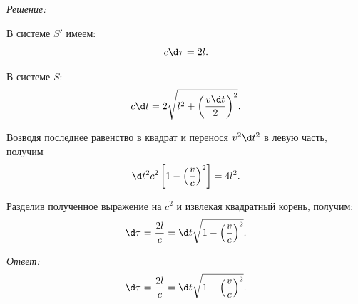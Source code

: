 \vspace*{2em}
\emph{Решение:}
    
    В системе \( S' \) имеем:
    \[
        c\d\tau = 2l.
    \]
    
    В системе \( S \):
    \[
        c\d t = 2\sqrt{l^2 + \left(\frac{v\d t}{2}\right)^2}.
    \]
    
    Возводя последнее равенство в квадрат и перенося \( v^2\d t^2 \) в левую часть,
    получим
    \[
        \d t^2c^2\left[1 - \left(\frac{v}{c}\right)^2\right] = 4l^2.
    \]
    
    Разделив полученное выражение на \( c^2 \) и извлекая квадратный корень,
    получим:
    \[
        \d\tau = \frac{2l}{c} = \d t\sqrt{1 - \left(\frac{v}{c}\right)^2}.
    \]
    
\vfill
\emph{Ответ:}
    \[
        \d\tau = \frac{2l}{c} = \d t\sqrt{1 - \left(\frac{v}{c}\right)^2}.
    \]

